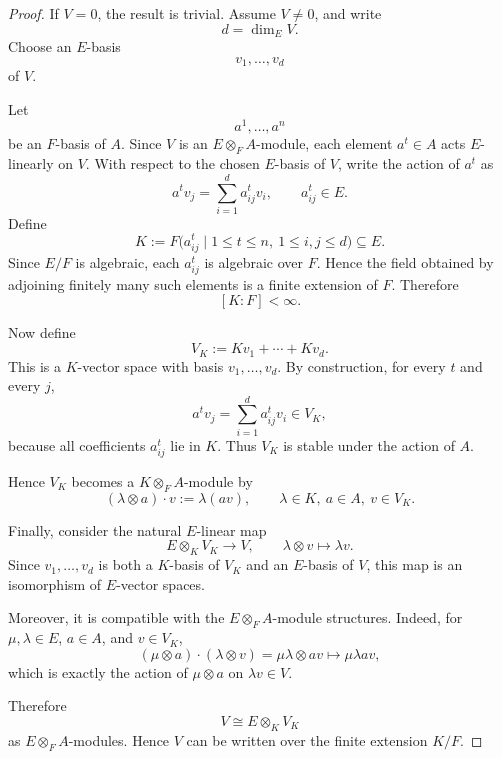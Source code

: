 \begin{proof}
    If \(V=0\), the result is trivial. Assume \(V\neq 0\), and write
    \[
        d=\dim_E V.
    \]
    Choose an \(E\)-basis
    \[
        v_1,\dots,v_d
    \]
    of \(V\).

    Let
    \[
        a^1,\dots,a^n
    \]
    be an \(F\)-basis of \(A\). Since \(V\) is an \(E\otimes_F A\)-module, each element
    \(a^t\in A\) acts \(E\)-linearly on \(V\). With respect to the chosen \(E\)-basis of
    \(V\), write the action of \(a^t\) as
    \[
        a^t v_j=\sum_{i=1}^d a_{ij}^t v_i,
        \qquad
        a_{ij}^t\in E.
    \]
    Define
    \[
        K:=F\bigl(a_{ij}^t\mid 1\leq t\leq n,\ 1\leq i,j\leq d\bigr)
        \subseteq E.
    \]
    Since \(E/F\) is algebraic, each \(a_{ij}^t\) is algebraic over \(F\). Hence the
    field obtained by adjoining finitely many such elements is a finite extension of
    \(F\). Therefore
    \[
        [K:F]<\infty.
    \]

    Now define
    \[
        V_K:=Kv_1+\cdots+Kv_d.
    \]
    This is a \(K\)-vector space with basis \(v_1,\dots,v_d\). By construction, for
    every \(t\) and every \(j\),
    \[
        a^t v_j=\sum_{i=1}^d a_{ij}^t v_i\in V_K,
    \]
    because all coefficients \(a_{ij}^t\) lie in \(K\). Thus \(V_K\) is stable under
    the action of \(A\).

    Hence \(V_K\) becomes a \(K\otimes_F A\)-module by
    \[
        (\lambda\otimes a)\cdot v
        :=
        \lambda(av),
        \qquad
        \lambda\in K,\ a\in A,\ v\in V_K.
    \]

    Finally, consider the natural \(E\)-linear map
    \[
        E\otimes_K V_K\longrightarrow V,
        \qquad
        \lambda\otimes v\longmapsto \lambda v.
    \]
    Since \(v_1,\dots,v_d\) is both a \(K\)-basis of \(V_K\) and an \(E\)-basis of
    \(V\), this map is an isomorphism of \(E\)-vector spaces.

    Moreover, it is compatible with the \(E\otimes_F A\)-module structures. Indeed,
    for \(\mu,\lambda\in E\), \(a\in A\), and \(v\in V_K\),
    \[
        (\mu\otimes a)\cdot(\lambda\otimes v)
        =
        \mu\lambda\otimes av
        \longmapsto
        \mu\lambda av,
    \]
    which is exactly the action of \(\mu\otimes a\) on \(\lambda v\in V\).

    Therefore
    \[
        V\cong E\otimes_K V_K
    \]
    as \(E\otimes_F A\)-modules. Hence \(V\) can be written over the finite extension
    \(K/F\).
\end{proof}

